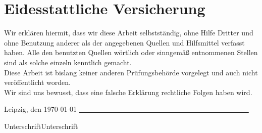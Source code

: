 
\newpage

\chapter*{Eidesstattliche Versicherung}
\vspace{3cm}

\normalsize
Wir erklären hiermit, dass wir diese Arbeit selbstständig, ohne Hilfe Dritter und ohne Benutzung anderer als der angegebenen Quellen und Hilfsmittel verfasst haben. Alle den benutzten Quellen wörtlich oder sinngemäß entnommenen Stellen sind als solche einzeln kenntlich gemacht.
\vspace{1cm}
\\
Diese Arbeit ist bislang keiner anderen Prüfungsbehörde vorgelegt und auch nicht veröffentlicht worden.
\vspace{1cm}
\\
Wir sind uns bewusst, dass eine falsche Erklärung rechtliche Folgen haben wird.
\\
\vspace{\fill}
\begin{flushleft}
Leipzig, den \today 
\hspace{\fill}
\underline{\ \ \ \ \ \ \ \ \ \ \ \ \ \ \ \ \ \ \ \ \ \ \ \ }\hspace{1cm}\underline{\ \ \ \ \ \ \ \ \ \ \ \ \ \ \ \ \ \ \ \ \ \ \ \ }
\end{flushleft}
\begin{flushright}
\small{Unterschrift}\hspace{2.2cm}\small{Unterschrift}
\end{flushright}
